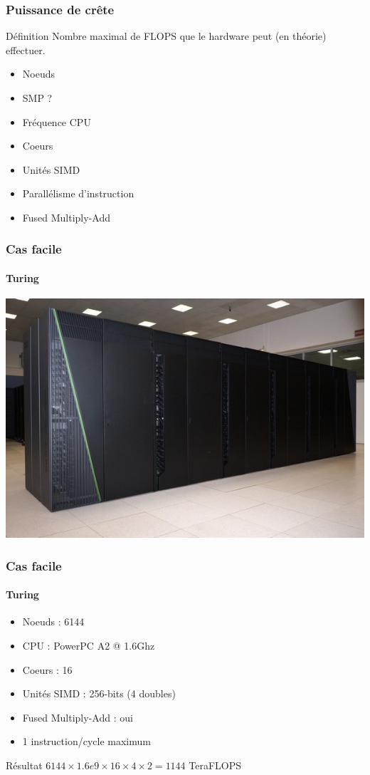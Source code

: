 \documentclass[xcolor={x11names,svgnames}]{beamer}
\begin{document}
\begin{frame}
  \frametitle{Puissance de crête}

  \begin{block}{Définition}
    Nombre maximal de FLOPS que le hardware peut (en théorie) effectuer.
  \end{block}

  \begin{itemize}
  \item Noeuds
  \item SMP ?
  \item Fréquence CPU
  \item Coeurs
  \item Unités SIMD
  \item Parallélisme d'instruction
  \item Fused Multiply-Add
  \end{itemize}
  
\end{frame}


\begin{frame}
  \frametitle{Cas facile}
  \framesubtitle{Turing}

  \includegraphics[width=\textwidth]{turing}
\end{frame}

\begin{frame}
  \frametitle{Cas facile}
  \framesubtitle{Turing}

  \begin{itemize}
  \item Noeuds : 6144
  \item CPU : PowerPC A2 @ 1.6Ghz
  \item Coeurs : 16
  \item Unités SIMD : 256-bits (4 doubles)
  \item Fused Multiply-Add : oui
  \item 1 instruction/cycle maximum
  \end{itemize}

  \begin{alertblock}{Résultat}
    $6144 \times 1.6e9 \times 16 \times 4 \times 2 = 1144$ TeraFLOPS
  \end{alertblock}
\end{frame}
\end{document}
